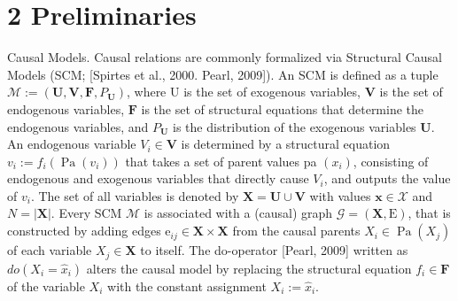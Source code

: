 \documentclass[10pt]{article}
\begin{document}
\section*{2 Preliminaries}
Causal Models. Causal relations are commonly formalized via Structural Causal Models (SCM; [Spirtes et al., 2000. Pearl, 2009]). An SCM is defined as a tuple $\mathcal{M}:=\left(\mathbf{U}, \mathbf{V}, \mathbf{F}, P_{\mathbf{U}}\right)$, where U is the set of exogenous variables, $\mathbf{V}$ is the set of endogenous variables, $\mathbf{F}$ is the set of structural equations that determine the endogenous variables, and $P_{\mathbf{U}}$ is the distribution of the exogenous variables $\mathbf{U}$. An endogenous variable $V_{i} \in \mathbf{V}$ is determined by a structural equation $v_{i}:=f_{i}\left(\operatorname{Pa}\left(v_{i}\right)\right)$ that takes a set of parent values pa $\left(x_{i}\right)$, consisting of endogenous and exogenous variables that directly cause $V_{i}$, and outputs the value of $v_{i}$. The set of all variables is denoted by $\mathbf{X}=\mathbf{U} \cup \mathbf{V}$ with values $\mathbf{x} \in \mathcal{X}$ and $N=|\mathbf{X}|$. Every SCM $\mathcal{M}$ is associated with a (causal) graph $\mathcal{G}=(\mathbf{X}, \mathrm{E})$, that is constructed by adding edges $\mathrm{e}_{i j} \in \mathbf{X} \times \mathbf{X}$ from the causal parents $X_{i} \in \operatorname{Pa}\left(X_{j}\right)$ of each variable $X_{j} \in \mathbf{X}$ to itself. The do-operator [Pearl, 2009] written as $d o\left(X_{i}=\hat{x}_{i}\right)$ alters the causal model by replacing the structural equation $f_{i} \in \mathbf{F}$ of the variable $X_{i}$ with the constant assignment $X_{i}:=\hat{x}_{i}$.\\[0pt]
\end{document}
